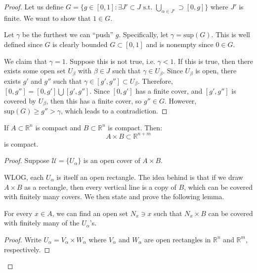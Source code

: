 \begin{itemize}
\begin{proof}
              Let us define $G=\{g\in [0,1]:\exists J' \subset J \text{ s.t. } \bigcup_{\alpha\in J'} \supset [0,g]\}$ where $J'$ is finite. We want to show that $1\in G.$
              \vspace{2mm}

              Let $\gamma$ be the furthest we can ``push'' $g$. Specifically, let $\gamma = \text{sup} (G)$. This is well defined since $G$ is clearly bounded $G \subset [0,1]$ and is nonempty since $0\in G.$
              \vspace{2mm}

              We claim that $\gamma = 1$. Suppose this is not true, i.e. $\gamma < 1$. If this is true, then there exists some open set $U_\beta$ with $\beta \in J$ such that $\gamma \in U_\beta.$ Since $U_\beta$ is open, there exists $g'$ and $g''$ such that $\gamma \in [g',g''] \subset U_\beta.$ Therefore, $[0,g''] = [0,g']\bigcup [g',g''].$ Since $[0,g']$ has a finite cover, and $[g',g'']$ is covered by $U_\beta$, then this has a finite cover, so $g'' \in G$. However, $\text{sup}(G) \ge g'' > \gamma$, which leads to a contradiction.

          \end{proof}
          \begin{theorem}
              If $A\subset \mathbb{R}^n$ is compact and $B\subset \mathbb{R}^n$ is compact. Then:
              \begin{equation}
                  A \times B \subset \mathbb{R}^{n+m}
              \end{equation}
              is compact.
          \end{theorem}
          \begin{proof}
              Suppose $\mathcal{U}=\{U_\alpha\}$ is an open cover of $A\times B$.

              WLOG, each $U_\alpha$ is itself an open rectangle. The idea behind is that if we draw $A\times B$ as a rectangle, then every vertical line is a copy of $B$, which can be covered with finitely many covers. We then state and prove the following lemma.
              \begin{lemma}
                  For every $x\in A$, we can find an open set $N_x \ni x$ such that $N_x\times B$ can be covered with finitely many of the $U_\alpha$'s.
                  \begin{proof}
                      Write $U_\alpha = V_\alpha \times W_\alpha$ where $V_\alpha$ and $W_\alpha$ are open rectangles in $\mathbb{R}^n$ and $\mathbb{R}^m$, respectively.
                      \vspace{2mm}


\end{proof}
\end{lemma}
\end{proof}
\end{itemize}
